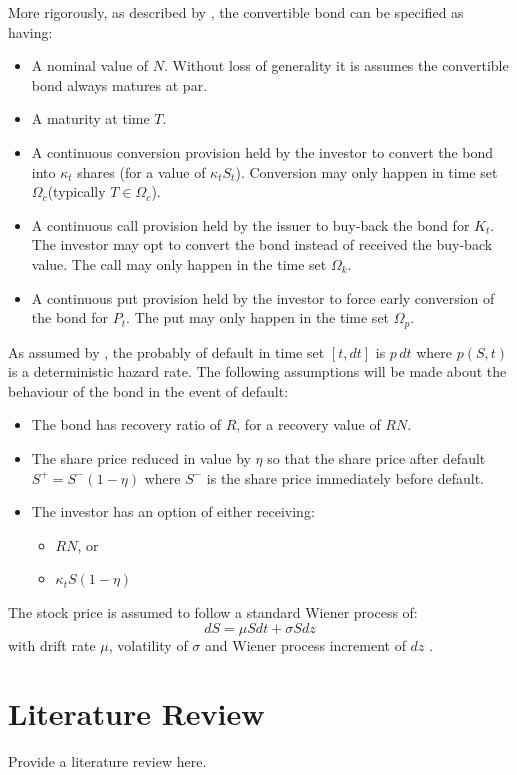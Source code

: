 \documentclass[a4paper,11pt,oneside]{article}
\def\convK{\ensuremath{\kappa_t}\xspace}
\def\convKS{\ensuremath{\convK S_t}\xspace}
\def\convT{\ensuremath{\Omega_c}\xspace}
\def\putK{\ensuremath{P_t}\xspace}
\def\putT{\ensuremath{\Omega_p}\xspace}
\def\callK{\ensuremath{K_t}\xspace}
\def\callT{\ensuremath{\Omega_k}\xspace}
\def\defN{\ensuremath{R}\xspace}
\def\defS{\ensuremath{\eta}\xspace}
\begin{document}
More rigorously, as described by \cite{AKW08}, the convertible bond can be specified as having:
\begin{itemize}
 \item A nominal value of $N$.  Without loss of generality it is assumes the convertible bond always matures at par.
 \item A maturity at time $T$.
 \item A continuous conversion provision held by the investor to convert the bond into \convK shares (for a value of \convKS).  Conversion may only happen in time set \convT (typically $T \in \convT$).
 \item A continuous call provision held by the issuer to buy-back the bond for \callK.  The investor may opt to convert the bond instead of received the buy-back value.  The call may only happen in the time set \callT.
 \item A continuous put provision held by the investor to force early conversion of the bond for \putK.  The put may only happen in the time set \putT.
\end{itemize}

As assumed by \cite{AFV03}, the probably of default in time set $[t, dt]$ is $p\,dt$ where $p(S, t)$ is a deterministic hazard rate.  The following assumptions will be made about the behaviour of the bond in the event of default:
\begin{itemize}
 \item The bond has recovery ratio of \defN, for a recovery value of $\defN N$.
 \item The share price reduced in value by \defS so that the share price after default $S^+ = S^- (1 - \defS)$ where $S^-$ is the share price immediately before default.
 \item The investor has an option of either receiving:
 \begin{itemize}
  \item $\defN N$, or
  \item $\convK S (1 - \defS)$
 \end{itemize}
\end{itemize}

The stock price is assumed to follow a standard Wiener process of:
\begin{displaymath}
dS = \mu S dt + \sigma S dz
\end{displaymath}
with drift rate $\mu$, volatility of $\sigma$ and Wiener process increment of $dz$ \cite{AFV03}.

\section{Literature Review}
Provide a literature review here.
\end{document}
